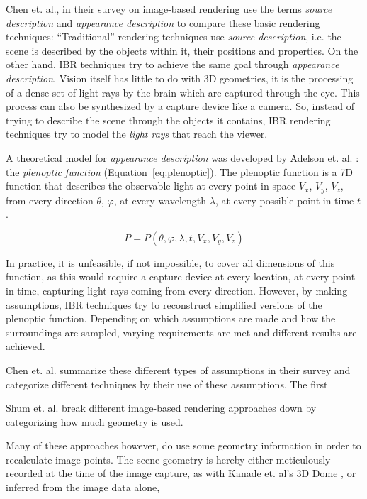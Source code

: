 Chen et. al., in their survey on image-based rendering \cite{survey2004} use the terms \emph{source description} and \emph{appearance description} to compare these basic rendering techniques: ``Traditional'' rendering techniques use \emph{source description}, i.e. the scene is described by the objects within it, their positions and properties. On the other hand, IBR techniques try to achieve the same goal through \emph{appearance description}. Vision itself has little to do with 3D geometries, it is the processing of a dense set of light rays by the brain which are captured through the eye. This process can also be synthesized by a capture device like a camera. So, instead of trying to describe the scene through the objects it contains, IBR rendering techniques try to model the \emph{light rays} that reach the viewer. 

A theoretical model for \emph{appearance description} was developed by Adelson et. al. \cite{Adelson91}: the \emph{plenoptic function} (Equation~\ref{eq:plenoptic}). The plenoptic function is a 7D function that describes the observable light at every point in space $V_x$, $V_y$, $V_z$, from every direction $\theta$, $\varphi$, at every wavelength $\lambda$, at every possible point in time $t$.

\begin{equation}
  \label{eq:plenoptic}
  P = P(\theta, \varphi, \lambda, t, V_x, V_y, V_z)
\end{equation}

In practice, it is unfeasible, if not impossible, to cover all dimensions of this function, as this would require a capture device at every location, at every point in time, capturing light rays coming from every direction. However, by making assumptions, IBR techniques try to reconstruct simplified versions of the plenoptic function. Depending on which assumptions are made and how the surroundings are sampled, varying requirements are met and different results are achieved.

Chen et. al. summarize these different types of assumptions in their survey \cite{survey2004} and categorize different techniques by their use of these assumptions. The first 

Shum et. al. \cite{survey2000} break different image-based rendering approaches down by categorizing how much geometry is used.  

Many of these approaches however, do use some geometry information in order to recalculate image points. The scene geometry is hereby either meticulously recorded at the time of the image capture, as with Kanade et. al's 3D Dome \cite{geometry97}, or inferred from the image data alone, 

